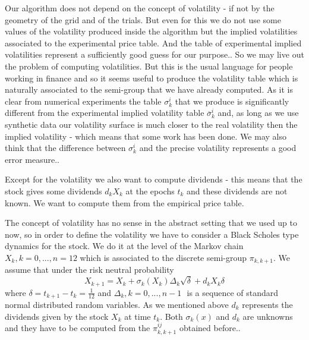 \documentclass[a4paper]{article}
\begin{document}
Our algorithm does not depend on the concept of volatility - if not by the
geometry of the grid and of the trials. But even for this we do not use some
values of the volatility produced inside the algorithm but the implied
volatilities associated to the experimental price table. And the table of
experimental implied volatilities represent a sufficiently good guess for
our purpose.. So we may live out the problem of computing volatilities. But
this is the usual language for people working in finance and so it seems
useful to produce the volatility table which is naturally associated to the
semi-group that we have already computed. As it is clear from numerical
experiments the table $\sigma _{k}^{i}$ that we produce is significantly
different from the experimental implied volatility table $\overline{\sigma }%
_{k}^{i}$ and, as long as we use synthetic data our volatility surface is
much closer to the real volatility then the implied volatility - which means
that some work has been done. We may also think that the difference between $%
\sigma _{k}^{i}$ and the precise volatility represents a good error measure..

Except for the volatility we also want to compute dividends - this means
that the stock gives some dividends $d_{k}X_{k}$ at the epochs $t_{k}$ and
these dividends are not known. We want to compute them from the empirical
price table.

The concept of volatility has no sense in the abstract setting that we used
up to now, so in order to define the volatility we have to consider a Black
Scholes type dynamics for the stock. We do it at the level of the Markov
chain $X_{k},k=0,...,n=12$ which is associated to the discrete semi-group $%
\pi _{k,k+1}.$ We assume that under the risk neutral probability
\[
X_{k+1}=X_{k}+\sigma _{k}(X_{k})\Delta _{k}\sqrt{\delta }+d_{k}X_{k}\delta
\]
where $\delta =t_{k+1}-t_{k}=\frac{1}{12}$ and $\Delta _{k},k=0,...,n-1$ $%
\hspace{0pt}$ is a sequence of standard normal distributed random variables.
As we mentioned above $d_{k}$ represents the dividends given by the stock $%
X_{k}$ at time $t_{k}$. Both $\sigma _{k}(x)$ and $d_{k}$ are unknowns and
they have to be computed from the $\pi _{k,k+1}^{ij}$ obtained before..
\end{document}
